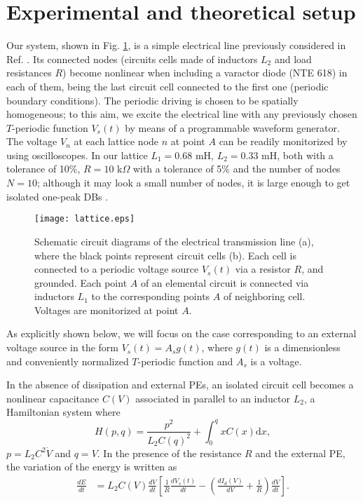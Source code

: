 \documentclass[showpacs,preprintnumbers,10pt,onecolumn]{revtex4}%
\begin{document}
\section{Experimental and theoretical setup}Our system, shown in Fig. \ref{lattice}, is a
simple electrical line previously considered in Ref. \cite{electric1}. Its connected
nodes (circuits cells made of inductors $L_{2}$ and load resistances $R$)
become nonlinear when including a varactor diode (NTE 618) in each of them, being the
last circuit cell connected to the first one (periodic boundary
conditions). The periodic driving is chosen to be spatially homogeneous; to this aim, we excite the electrical line with any
previously chosen $T$-periodic function $V_{s}(t)$ by means of a programmable waveform generator. The voltage $V_n$ at each lattice node $n$ at point $A$
can be readily monitorized by using oscilloscopes. In our lattice $L_1=0.68$ mH, $L_2= 0.33$ mH, both with a tolerance of 10\%, $R=10$ k$\Omega$ with a tolerance of 5\% and the number of nodes $N=10$; although it may look a small number of nodes, it is large enough to get 
isolated one-peak DBs \cite{electric1}.


\begin{figure}[ptb]
\texttt{[image: lattice.eps]}
\caption{Schematic circuit
diagrams of the electrical transmission line (a), where the black points
represent circuit cells (b). Each cell is connected to a
periodic voltage source $V_{s}(t)$ via a resistor $R$, and grounded. Each
point $A$ of an elemental circuit is connected via inductors $L_{1}$ to the
corresponding points $A$ of neighboring cell. Voltages are
monitorized at point $A$.}%
\label{lattice}%
\end{figure}

As explicitly shown below, we will focus on the case corresponding to an
external voltage source in the form $V_{s}(t)=A_{s}g(t)$, where $g(t)$ is a
dimensionless and conveniently normalized $T$-periodic function and $A_{s}$ is a voltage.


In the absence of dissipation and external PEs, an isolated 
circuit cell becomes a nonlinear capacitance $C(V)$ associated in parallel to an inductor $L_2$, a Hamiltonian system where
\begin{equation}
H(p,q)=\frac{p^2}{L_2C(q)^2}+\int_{0}^{q} x C(x) \mathrm{d}x,
\end{equation}
$p=L_2C^{2}\dot{V}$ and  $q=V$. In the presence of the resistance $R$ and the external PE, the variation of the
energy is written as
\begin{align}
\frac{dE}{dt} &  =L_2 C(V)\frac{dV}{dt}\left[\frac{1}{R}%
\frac{d V_s(t)}{d t}-\left(  \frac{dI_{d}(V)}{dV}+\frac{1}{R}\right)
\frac{d V}{d t}\right].
\end{align}
\end{document}

